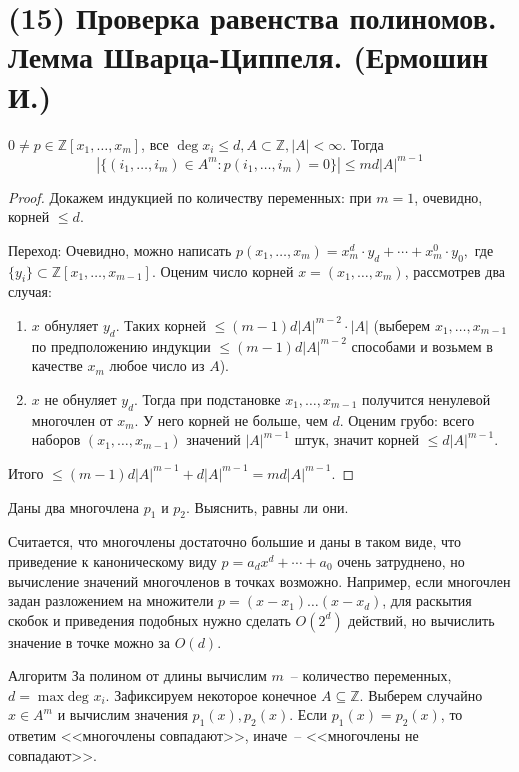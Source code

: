 \section{(15) Проверка равенства полиномов. Лемма Шварца-Циппеля. (Ермошин И.)}

\begin{lemma*}
	$0\ne p\in\mathbb{Z}[x_1,\ldots,x_m]$, все $\deg x_i\le d, A\subset\mathbb{Z}, |A|<\infty$. Тогда $$\left|\{(i_1,\ldots,i_m)\in A^m\colon p(i_1,\ldots,i_m)=0\}\right|\le md|A|^{m-1}$$
\end{lemma*}
\begin{proof}
Докажем индукцией по количеству переменных: при $m=1$, очевидно, корней $\le d$.

Переход:
Очевидно, можно написать $p(x_1,\ldots,x_m)=x_m^d\cdot y_d+\cdots+x_m^0\cdot y_0,$ где $\{y_i\}\subset \mathbb Z[x_1,\ldots,x_{m-1}]$. Оценим число корней $x = (x_1, \ldots, x_m)$, рассмотрев два случая:
\begin{enumerate}
\item $x$ обнуляет $y_d$. Таких корней $\le (m-1)d|A|^{m-2} \cdot |A|$ (выберем $x_1,\ldots,x_{m-1}$ по предположению индукции $\le(m-1)d|A|^{m-2}$ способами и возьмем в качестве $x_m$ любое число из $A$).
\item $x$ не обнуляет $y_d$. Тогда при подстановке $x_1, \ldots, x_{m-1}$ получится ненулевой многочлен от $x_m$. У него корней не больше, чем $d$. Оценим грубо: всего наборов $(x_1, \ldots, x_{m-1})$ значений $|A|^{m-1}$ штук, значит корней $\le d|A|^{m-1}$.
\end{enumerate}

Итого $\le (m-1)d|A|^{m-1}+d|A|^{m-1}=md|A|^{m-1}.$
\end{proof}

\begin{problem*}
	Даны два многочлена $p_1$ и $p_2$. Выяснить, равны ли они.
\end{problem*}

Считается, что многочлены достаточно большие и даны в таком виде, что приведение к каноническому виду $p = a_d x^d + \cdots + a_0$ очень затруднено, но вычисление значений многочленов в точках возможно. Например, если многочлен задан разложением на множители $p = (x-x_1)\ldots(x-x_d)$, для раскытия скобок и приведения подобных нужно сделать $O(2^d)$ действий, но вычислить значение в точке можно за $O(d)$.

\begin{algodescription}{Алгоритм} За полином от длины вычислим $m$~-- количество переменных, $d = \max\text{deg } x_i$. Зафиксируем некоторое конечное $A \subseteq \mathbb Z$. Выберем случайно $x \in A^m$ и вычислим значения $p_1(x), p_2(x)$. Если $p_1(x) = p_2(x)$, то ответим <<многочлены совпадают>>, иначе~-- <<многочлены не совпадают>>.
\end{algodescription}

